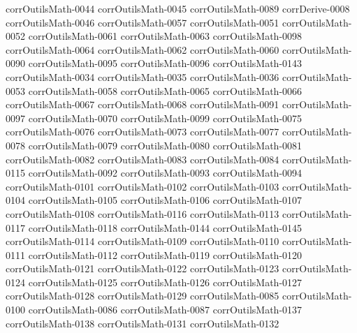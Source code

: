 {corrOutilsMath-0044}
{corrOutilsMath-0045}
{corrOutilsMath-0089}
{corrDerive-0008}
{corrOutilsMath-0046}
{corrOutilsMath-0057}
{corrOutilsMath-0051}
{corrOutilsMath-0052}
{corrOutilsMath-0061}
{corrOutilsMath-0063}
{corrOutilsMath-0098}
{corrOutilsMath-0064}
{corrOutilsMath-0062}
{corrOutilsMath-0060}
{corrOutilsMath-0090}
{corrOutilsMath-0095}
{corrOutilsMath-0096}
{corrOutilsMath-0143}
{corrOutilsMath-0034}
{corrOutilsMath-0035}
{corrOutilsMath-0036}
{corrOutilsMath-0053}
{corrOutilsMath-0058}
{corrOutilsMath-0065}
{corrOutilsMath-0066}
{corrOutilsMath-0067}
{corrOutilsMath-0068}
{corrOutilsMath-0091}
{corrOutilsMath-0097}
{corrOutilsMath-0070}
{corrOutilsMath-0099}
{corrOutilsMath-0075}
{corrOutilsMath-0076}
{corrOutilsMath-0073}
{corrOutilsMath-0077}
{corrOutilsMath-0078}
{corrOutilsMath-0079}
{corrOutilsMath-0080}
{corrOutilsMath-0081}
{corrOutilsMath-0082}
{corrOutilsMath-0083}
{corrOutilsMath-0084}
{corrOutilsMath-0115}
{corrOutilsMath-0092}
{corrOutilsMath-0093}
{corrOutilsMath-0094}
{corrOutilsMath-0101}
{corrOutilsMath-0102}
{corrOutilsMath-0103}
{corrOutilsMath-0104}
{corrOutilsMath-0105}
{corrOutilsMath-0106}
{corrOutilsMath-0107}
{corrOutilsMath-0108}
{corrOutilsMath-0116}
{corrOutilsMath-0113}
{corrOutilsMath-0117}
{corrOutilsMath-0118}
{corrOutilsMath-0144}
{corrOutilsMath-0145}
{corrOutilsMath-0114}
{corrOutilsMath-0109}
{corrOutilsMath-0110}
{corrOutilsMath-0111}
{corrOutilsMath-0112}
{corrOutilsMath-0119}
{corrOutilsMath-0120}
{corrOutilsMath-0121}
{corrOutilsMath-0122}
{corrOutilsMath-0123}
{corrOutilsMath-0124}
{corrOutilsMath-0125}
{corrOutilsMath-0126}
{corrOutilsMath-0127}
{corrOutilsMath-0128}
{corrOutilsMath-0129}
{corrOutilsMath-0085}
{corrOutilsMath-0100}
{corrOutilsMath-0086}
{corrOutilsMath-0087}
{corrOutilsMath-0137}
{corrOutilsMath-0138}
{corrOutilsMath-0131}
{corrOutilsMath-0132}
